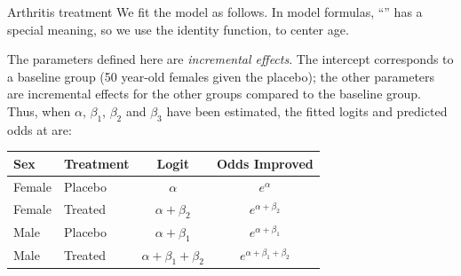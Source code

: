 \documentclass[11pt]{book}
\renewenvironment{knitrout}{\small\renewcommand{\baselinestretch}{.85}}{} %
\begin{document}
\begin{Example}{Arthritis treatment}
We fit the model as follows.  In  model formulas, ``\code{-}'' has a special meaning, so we use
the identity function,  to center age.
\begin{knitrout}
\color{fgcolor}\begin{kframe}
\begin{alltt}
 \hlkwb{<-}  \hlopt{~} \hlopt{-}\hlstd{)} \hlopt{+}  \hlopt{+} 
\end{alltt}
\end{kframe}
\end{knitrout}


The parameters defined here are \emph{incremental effects}.  The
intercept corresponds to a baseline group (50 year-old females given the placebo);
the other parameters are incremental effects for the other groups
compared to the baseline group.
Thus, when \(\alpha\), \(\beta _1\), \(\beta _2\) and \(\beta _3\)  have
been estimated, the fitted logits and predicted odds at  are:

\begin{center}
\vspace{1ex}
{\renewcommand{\arraystretch}{1.2}
\begin{tabular}{|ll|cc|}
\hline
Sex  &  Treatment & Logit & Odds Improved  \\[.5ex] \hline

Female  & Placebo  & \(\alpha \) & \(e^{\alpha}\) \\
Female   & Treated  & \(\alpha + \beta_2 \) & \(e^{\alpha + \beta_2 }\) \\
Male & Placebo & \(\alpha + \beta_1 \) & \(e^{\alpha + \beta_1 }\) \\
Male & Treated & \(\alpha + \beta_1 + \beta_2\) & \(e^{\alpha + \beta_1 + \beta_2}\)  \\  \hline
\end{tabular}
}
\end{center}


\end{Example}
\end{document}
